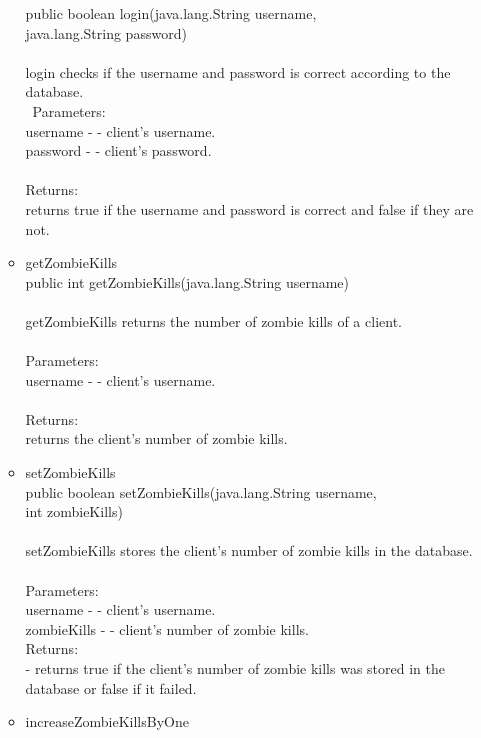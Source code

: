 \documentclass[letterpaper]{article}
\begin{document}
\begin{itemize}
\begin{itemize}
											public boolean login(java.lang.String username, \\
		            java.lang.String password) \\ \\
											login checks if the username and password is correct according to the database. \\ \
											Parameters: \\
											username - - client's username. \\
											password - - client's password. \\ \\
											Returns: \\
											returns true if the username and password is correct and false if they are not.
									\item	getZombieKills \\
											public int getZombieKills(java.lang.String username) \\ \\
											getZombieKills returns the number of zombie kills of a client. \\ \\
											Parameters: \\
											username - - client's username. \\ \\
											Returns:  \\
											returns the client's number of zombie kills.
									\item	setZombieKills \\
											public boolean setZombieKills(java.lang.String username, \\
		                     int zombieKills) \\ \\
											setZombieKills stores the client's number of zombie kills in the database. \\ \\
											Parameters: \\
											username - - client's username. \\
											zombieKills - - client's number of zombie kills. \\
											Returns: \\
											- returns true if the client's number of zombie kills was stored in the database or false if it failed.
									\item	increaseZombieKillsByOne \\

\end{itemize}
\end{itemize}
\end{document}

